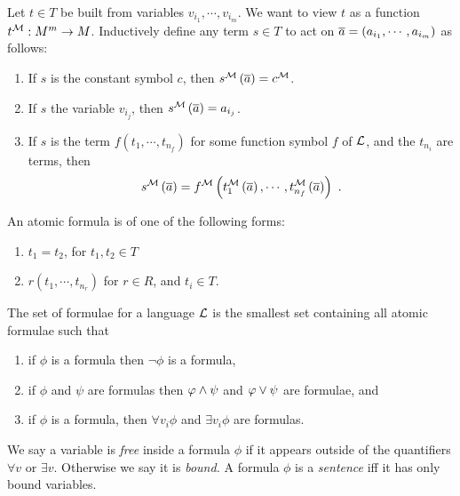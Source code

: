 \documentclass{amsart}
\begin{document}
Let $t\in T$ be built from variables 
$v_{i_1} , \cdots, v_{i_m}$. We want to view $t$ as a function
$t^{\mathcal{M}} : M^m\rightarrow M$.
Inductively define any term $s\in T$ to act on
$\overline{a} = \left( a_{i_1} , \cdots , a_{i_m} \right)$ as follows:
\begin{enumerate}
\item If $s$ is the constant symbol $c$, then $s^{\mathcal{M}}\left( \overline{a} \right) = c^{\mathcal{M}}$.
\item If $s$ the variable $v_{i_j}$, then $s^{\mathcal{M}}\left( \overline{a} \right) = a_{i_j}$.
\item If $s$ is the term $f\left( t_1 , \cdots , t_{n_f} \right)$
for some function symbol $f$ of $\mathcal{L}$, and the $t_{n_i}$ are terms, then
\begin{equation}
s^{\mathcal{M}} \left( \overline{a} \right) = 
f^{\mathcal{M}}\left( t_1^{\mathcal{M}}\left(\overline{a} \right) , \cdots , 
t_{n_f}^{\mathcal{M}}\left( \overline{a} \right)\right) \ .
\end{equation}
\end{enumerate}

\begin{defn}
An atomic formula is of one of the following forms:
\begin{enumerate}
\item $t_1 = t_2$, for $t_1 , t_2\in T$
\item $r\left( t_1 , \cdots , t_{n_r} \right)$ for $r\in R$, and $t_i\in T$.
\end{enumerate}
\end{defn}

\begin{defn}
The set of formulae for a language $\mathcal{L}$ is the smallest set containing all atomic formulae
such that 
\begin{enumerate}
\item if $\phi$ is a formula then $\neg \phi$ is a formula, 
\item if $\phi$ and $\psi$ are formulas then $\varphi \wedge \psi$ 
and $\varphi \vee \psi$ are formulae, and
\item if $\phi$ is a formula, then $\forall v_i \phi$ and $\exists v_i \phi$
are formulas.
\end{enumerate}
\end{defn}

\begin{defn}
We say a variable is \emph{free} inside a formula $\phi$ if it appears outside of
the quantifiers $\forall v$ or $\exists v$.
Otherwise we say it is \emph{bound.}
A formula $\phi$ is a \emph{sentence} iff it has only bound variables.
\end{defn}
\end{document}

